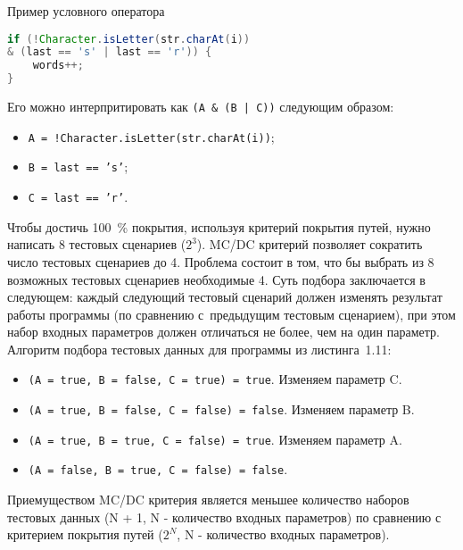 \begin{ListingEnv}[!h]%
	\captiondelim{ } %
	\caption{Пример условного оператора}
	\begin{lstlisting}[language={Java}]
if (!Character.isLetter(str.charAt(i)) 
& (last == 's' | last == 'r')) {
	words++;
}
	\end{lstlisting}
\end{ListingEnv}%

Его можно интерпритировать как \texttt{(A \& (B | C))} следующим образом:

\begin{itemize}
	\item \texttt{A = !Character.isLetter(str.charAt(i))};
	\item \texttt{B = last == 's'};
	\item\texttt{C = last == 'r'}.
\end{itemize}

Чтобы достичь 100~\% покрытия, используя критерий покрытия путей, нужно написать 8 тестовых сценариев (\(2^3\)). MC/DC критерий позволяет сократить число тестовых сценариев до 4. Проблема состоит в том, что бы выбрать из 8 возможных тестовых сценариев необходимые 4. Суть подбора заключается в следующем:  каждый следующий тестовый сценарий должен изменять результат работы программы (по сравнению с~предыдущим тестовым сценарием), при этом набор входных параметров должен отличаться не более, чем на один параметр.  Алгоритм подбора тестовых данных для программы из листинга~1.11: 

\begin{itemize}
	\item \texttt{(A = true, B = false, C = true) = true}. Изменяем параметр C.
	\item \texttt{(A = true, B = false, C = false) = false}. Изменяем параметр B.
	\item \texttt{(A = true, B = true, C = false) = true}. Изменяем параметр A.
	\item \texttt{(A = false, B = true, C = false) = false}.
\end{itemize}

Приемуществом MC/DC критерия является меньшее количество наборов тестовых данных (N + 1, N - количество входных параметров) по сравнению с критерием покрытия путей (\(2^N\), N - количество входных параметров).


